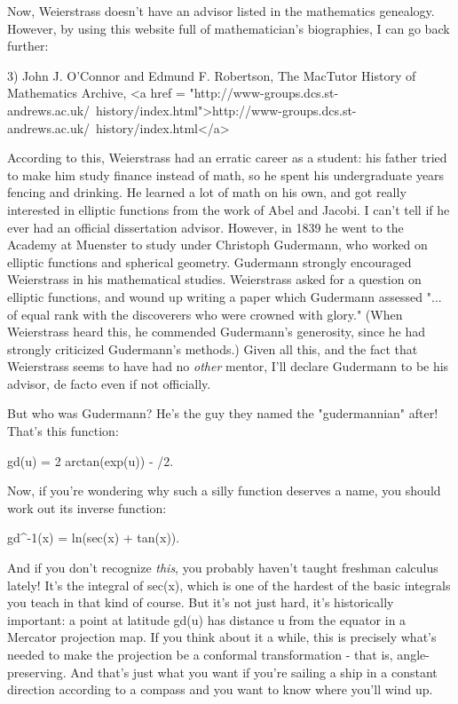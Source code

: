 Now, Weierstrass doesn't have an advisor listed in the mathematics
genealogy.  However, by using this website full of mathematician's
biographies, I can go back further:

3) John J. O'Connor and Edmund F. Robertson, The MacTutor History of
Mathematics Archive, 
<a href = "http://www-groups.dcs.st-andrews.ac.uk/~history/index.html">http://www-groups.dcs.st-andrews.ac.uk/~history/index.html</a>

According to this, Weierstrass had an erratic career as a student: his
father tried to make him study finance instead of math, so he spent
his undergraduate years fencing and drinking.  He learned a lot of
math on his own, and got really interested in elliptic functions from
the work of Abel and Jacobi.  I can't tell if he ever had an official
dissertation advisor.  However, in 1839 he went to the Academy at
Muenster to study under Christoph Gudermann, who worked on elliptic 
functions and spherical geometry.  Gudermann strongly encouraged 
Weierstrass in his mathematical studies.  Weierstrass asked for a
question on elliptic functions, and wound up writing a paper which
Gudermann assessed "... of equal rank with the discoverers who were
crowned with glory."  (When Weierstrass heard this, he commended
Gudermann's generosity, since he had strongly criticized 
Gudermann's methods.)
Given all this, and the fact that Weierstrass seems 
to have had no \emph{other} mentor, I'll declare Gudermann to be his 
advisor, de facto even if not officially.

But who was Gudermann?  He's the guy they named the "gudermannian" 
after!  That's this function:

gd(u) = 2 arctan(exp(u)) - \pi /2.

Now, if you're wondering why such a silly function deserves a name,
you should work out its inverse function:

gd^{-1}(x) = ln(sec(x) + tan(x)).

And if you don't recognize \emph{this}, you probably haven't taught
freshman calculus lately!  It's the integral of sec(x), which is one
of the hardest of the basic integrals you teach in that kind of
course.  But it's not just hard, it's historically important: a point
at latitude gd(u) has distance u from the equator in a Mercator
projection map.  If you think about it a while, this is precisely
what's needed to make the projection be a conformal transformation -
that is, angle-preserving.  And that's just what you want if you're
sailing a ship in a constant direction according to a compass and you
want to know where you'll wind up.

